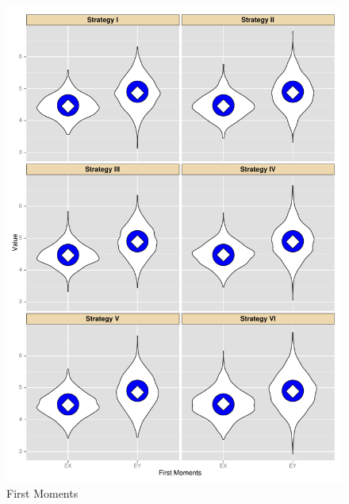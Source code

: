 \documentclass[xetex]{beamer}
\begin{document}
	\begin{frame}[plain]
	    \begin{columns} 
	    	\begin{column}[t]{.5\textwidth}	
				\begin{figure}
					\caption{First Moments}
					\includegraphics[height=.9\textheight, keepaspectratio]{./picts/firstMomentsBaragatti}
				\end{figure}	
			\end{column}


\end{columns}
\end{frame}
\end{document}
